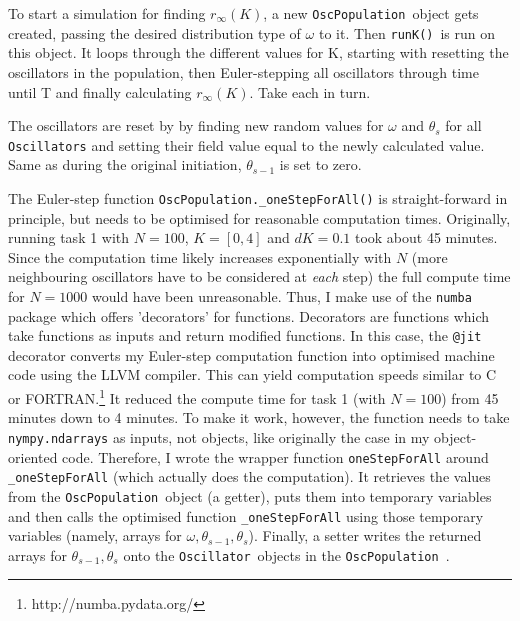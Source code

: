 \documentclass[11pt,a4paper]{article}
\newcommand{\graph}{\medskip\noindent}
\newcommand{\osc}{\texttt{Oscillator}~}
\newcommand{\oscpop}{\texttt{OscPopulation}~}
\newcommand{\runK}{\code{runK()}~}
\newcommand{\code}[1]{\texttt{#1}}
\begin{document}
To start a simulation for finding $r_\infty(K)$, a new \oscpop object gets created, passing the desired distribution type of $\omega$ to it.
Then \runK is run on this object.
It loops through the different values for K, starting with resetting the oscillators in the population, then Euler-stepping all oscillators through time until T and finally calculating $r_\infty(K)$. 
Take each in turn. 




\graph
The oscillators are reset by by finding new random values for $\omega$ and $\theta_s$ for all \code{Oscillators} and setting their field value equal to the newly calculated value. 
Same as during the original initiation, $\theta_{s-1}$ is set to zero.



\graph
The Euler-step function \code{OscPopulation.\_oneStepForAll()} is straight-forward in principle, but needs to be optimised for reasonable computation times. 
Originally, running task 1 with $ N = 100$, $K = [0, 4]$ and $dK = 0.1$ took about 45 minutes. 
Since the computation time likely increases exponentially with $N$ (more neighbouring oscillators have to be considered at \textit{each} step) the full compute time for $N=1000$ would have been unreasonable. 
Thus, I make use of the \code{numba} package which offers 'decorators' for functions. 
Decorators are functions which take functions as inputs and return modified functions.
In this case, the \code{@jit} decorator converts my Euler-step computation function into optimised machine code using the LLVM compiler. 
This can yield computation speeds similar to C or FORTRAN.\footnote{http://numba.pydata.org/}
It reduced the compute time for task 1 (with $N = 100$) from 45 minutes down to 4 minutes. 
%
To make it work, however, the function needs to take \code{nympy.ndarrays} as inputs, not objects, like originally the case in my object-oriented code. 
Therefore, I wrote the wrapper function \code{oneStepForAll} around \code{\_oneStepForAll} (which actually does the computation). 
It retrieves the values from the \oscpop object (a getter), puts them into temporary variables and then calls the optimised function \code{\_oneStepForAll} using those temporary variables (namely, arrays for $\omega, \theta_{s-1}, \theta_{s}$).
Finally, a setter writes the returned arrays for $\theta_{s-1}, \theta_{s}$ onto the \osc objects in the \oscpop. 
\end{document}
